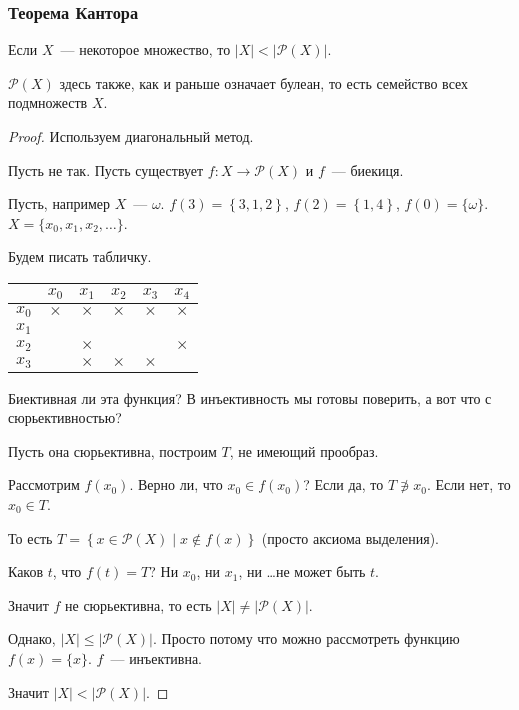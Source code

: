 \subsubsection{Теорема Кантора}
\begin{theorem}
    Если $X$~--- некоторое множество, то $|X| < \left|\mathcal{P} (X) \right|$.
\end{theorem}
\begin{note}
    $\mathcal{P}(X)$ здесь также, как и раньше означает булеан, то есть семейство всех подмножеств $X$.
\end{note}
\begin{proof}
    Используем диагональный метод.

    Пусть не так. Пусть существует $f: X \to \mathcal{P}(X)$ и $f$~--- биекиця.

    Пусть, например  $X$~--- $\omega$. $f(3) = \left\{3, 1, 2 \right\}$, $f(2) = \left\{ 1, 4\right\}$, $f(0) = \{ \omega\}$.
    $X = \{ x_0, x_1, x_2, \dots \}$.

    Будем писать табличку.
    \begin{tabular}{|l|c|c|c|c|c|}
    \hline
    & $x_0$ & $x_1$ & $x_2$ & $x_3$ & $x_4$\\
    \hline
    $x_0$ & $\times$ & $\times$ & $\times$ & $\times$ & $\times$\\
    \hline
    $x_1$ & & & & & \\
    \hline
    $x_2$ & & $\times$ & & & $\times$\\
    \hline
    $x_3$ &  & $\times$ & $\times$ & $\times$ & \\
    \hline
    \end{tabular}
    \vspace{0.2cm}

    Биективная ли эта функция? В инъективность мы готовы поверить, а вот что с сюрьективностью?

    Пусть она сюрьективна, построим $T$, не имеющий прообраз.

    Рассмотрим $f(x_0)$. Верно ли, что $x_0 \in f(x_0)$? Если да, то $T\not\ni x_0$. Если нет, то $x_0 \in T$.

    То есть $T = \left\{ x \in \mathcal{P}(X) \mid x \notin f(x) \right\}$ (просто аксиома выделения).

    Каков $t$, что $f(t) = T$? Ни $x_0$, ни $x_1$, ни \ldots не может быть $t$.

    Значит $f$ не сюрьективна, то есть $|X| \neq \left| \mathcal{P}(X)\right|$.

    Однако, $|X| \leqslant \left|\mathcal{P}(X)\right|$. Просто потому что можно рассмотреть функцию $f(x) = \{ x\}$. $f$~--- инъективна.

    Значит $|X| < \left| \mathcal P (X)\right|$.
\end{proof}

